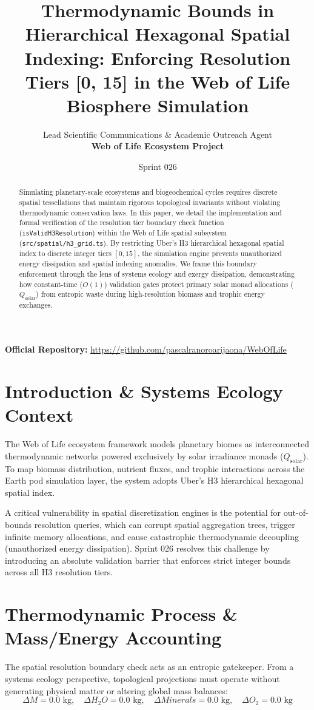 \documentclass[11pt, a4paper]{article}
\title{\textbf{Thermodynamic Bounds in Hierarchical Hexagonal Spatial Indexing: Enforcing Resolution Tiers [0, 15] in the Web of Life Biosphere Simulation}}
\author{Lead Scientific Communications \& Academic Outreach Agent\\ \textbf{Web of Life Ecosystem Project}}
\date{Sprint 026}
\begin{document}
\maketitle

\begin{abstract}
Simulating planetary-scale ecosystems and biogeochemical cycles requires discrete spatial tessellations that maintain rigorous topological invariants without violating thermodynamic conservation laws. In this paper, we detail the implementation and formal verification of the resolution tier boundary check function (\texttt{isValidH3Resolution}) within the Web of Life spatial subsystem (\texttt{src/spatial/h3\_grid.ts}). By restricting Uber's H3 hierarchical hexagonal spatial index to discrete integer tiers $[0, 15]$, the simulation engine prevents unauthorized energy dissipation and spatial indexing anomalies. We frame this boundary enforcement through the lens of systems ecology and exergy dissipation, demonstrating how constant-time ($O(1)$) validation gates protect primary solar monad allocations ($Q_{\text{solar}}$) from entropic waste during high-resolution biomass and trophic energy exchanges.
\end{abstract}

\noindent\textbf{Official Repository:} \url{https://github.com/pascalranoroarijaona/WebOfLife}

\section{Introduction \& Systems Ecology Context}
The Web of Life ecosystem framework models planetary biomes as interconnected thermodynamic networks powered exclusively by solar irradiance monads ($Q_{\text{solar}}$). To map biomass distribution, nutrient fluxes, and trophic interactions across the Earth pod simulation layer, the system adopts Uber's H3 hierarchical hexagonal spatial index.

A critical vulnerability in spatial discretization engines is the potential for out-of-bounds resolution queries, which can corrupt spatial aggregation trees, trigger infinite memory allocations, and cause catastrophic thermodynamic decoupling (unauthorized energy dissipation). Sprint 026 resolves this challenge by introducing an absolute validation barrier that enforces strict integer bounds across all H3 resolution tiers.

\section{Thermodynamic Process \& Mass/Energy Accounting}
The spatial resolution boundary check acts as an entropic gatekeeper. From a systems ecology perspective, topological projections must operate without generating physical matter or altering global mass balances:
\begin{equation}
\Delta M = 0.0 \text{ kg}, \quad \Delta H_2O = 0.0 \text{ kg}, \quad \Delta Minerals = 0.0 \text{ kg}, \quad \Delta O_2 = 0.0 \text{ kg}
\end{equation}
\end{document}
